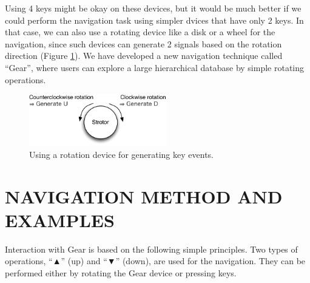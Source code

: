 \documentclass{article}
\def\up{▲}
\def\down{▼}
\begin{document}


Using 4 keys might be okay on these devices, but it would be much better
if we could perform the navigation task using simpler dvices that have only 2 keys.
In that case, we can also use a rotating device like a disk or a wheel for the navigation,
since such devices can generate 2 signals based on the rotation direction (Figure \ref{rotation}).
%
%
We have developed a new navigation technique called ``{Gear}'',
where users can explore a large hierarchical database by simple rotating operations.

\begin{figure}[H]
\centerline{\includegraphics[width=60mm,bb=0 0 294 110]{figures/rotation.pdf}}
\caption{Using a rotation device for generating key events.}
\label{rotation}
\end{figure}

\section*{NAVIGATION METHOD AND EXAMPLES}
\label{navigation}

Interaction with Gear is based on the following simple principles.
Two types of operations, ``{\up}'' (up) and ``{\down}'' (down), are used for the navigation.
They can be performed either by rotating the Gear device or pressing keys.
\end{document}

